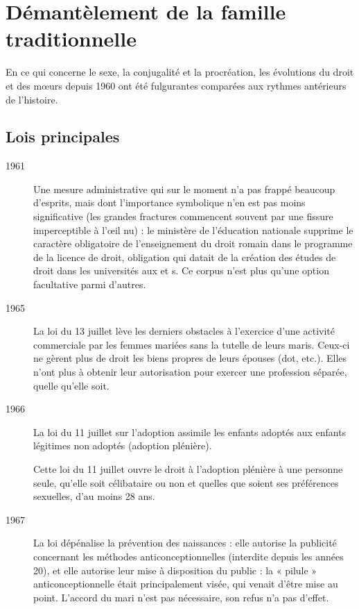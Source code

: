 
\chapter{Démantèlement de la famille traditionnelle}


 En ce qui concerne le sexe, la conjugalité et la procréation, les évolutions du droit et des mœurs depuis 1960 ont été fulgurantes comparées aux rythmes antérieurs de l'histoire.


\section{Lois principales}

\begin{description}

\item[1961] Une mesure administrative qui sur le moment n'a pas frappé beaucoup d'esprits, mais dont l'importance symbolique n'en est pas moins significative (les grandes fractures commencent souvent par une fissure imperceptible à l'œil nu) : le ministère de l'éducation nationale supprime le caractère obligatoire de l'enseignement du droit romain dans le programme de la licence de droit, obligation qui datait de la création des études de droit dans les universités aux  et s. Ce corpus n'est plus qu'une option facultative parmi d'autres. 

\item[1965] La loi du 13 juillet lève les derniers obstacles à l'exercice d'une activité commerciale par les femmes mariées sans la tutelle de leurs maris. Ceux-ci ne gèrent plus de droit les biens propres de leurs épouses (dot, etc.). Elles n'ont plus à obtenir leur autorisation pour exercer une profession séparée, quelle qu'elle soit.

\item[1966] La loi du 11 juillet sur l'adoption assimile les enfants adoptés aux enfants légitimes non adoptés (adoption plénière). 

Cette
loi du 11 juillet ouvre le droit à l'adoption plénière à une personne seule, qu'elle soit célibataire ou non et quelles que soient ses préférences sexuelles, d'au moins 28 ans.

\item[1967] La loi  dépénalise la prévention des naissances : elle autorise la publicité concernant les méthodes anticonceptionnelles (interdite depuis les années 20), et elle autorise leur mise à disposition du public :
la « pilule » anticonceptionnelle était principalement visée,
qui venait d'être mise au point. L'accord du mari n'est pas nécessaire, son refus n'a pas d'effet.


\end{description}

